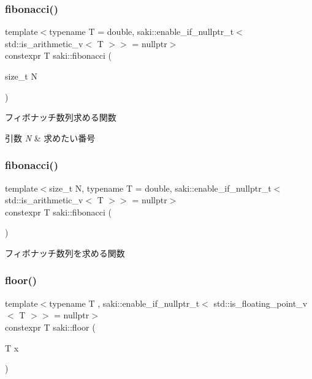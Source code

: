 \subsubsection{\texorpdfstring{fibonacci()}{fibonacci()}\hspace{0.1cm}{\footnotesize\ttfamily [1/2]}}
{\footnotesize\ttfamily template$<$typename T  = double, saki\+::enable\+\_\+if\+\_\+nullptr\+\_\+t$<$ std\+::is\+\_\+arithmetic\+\_\+v$<$ T $>$$>$  = nullptr$>$ \\
constexpr T saki\+::fibonacci (\begin{DoxyParamCaption}\item[{size\+\_\+t}]{N }\end{DoxyParamCaption})}



フィボナッチ数列求める関数 


\begin{DoxyParams}{引数}
{\em N} & 求めたい番号 \\
\hline
\end{DoxyParams}
\mbox{\label{namespacesaki_ac830e7b8acb5cda194f6ba9f340e5bc0}} 
\subsubsection{\texorpdfstring{fibonacci()}{fibonacci()}\hspace{0.1cm}{\footnotesize\ttfamily [2/2]}}
{\footnotesize\ttfamily template$<$size\+\_\+t N, typename T  = double, saki\+::enable\+\_\+if\+\_\+nullptr\+\_\+t$<$ std\+::is\+\_\+arithmetic\+\_\+v$<$ T $>$$>$  = nullptr$>$ \\
constexpr T saki\+::fibonacci (\begin{DoxyParamCaption}{ }\end{DoxyParamCaption})}



フィボナッチ数列を求める関数 

\mbox{\label{namespacesaki_a0718c031975604811084b62bbba93f7f}} 
\subsubsection{\texorpdfstring{floor()}{floor()}\hspace{0.1cm}{\footnotesize\ttfamily [1/2]}}
{\footnotesize\ttfamily template$<$typename T , saki\+::enable\+\_\+if\+\_\+nullptr\+\_\+t$<$ std\+::is\+\_\+floating\+\_\+point\+\_\+v$<$ T $>$$>$  = nullptr$>$ \\
constexpr T saki\+::floor (\begin{DoxyParamCaption}\item[{T}]{x }\end{DoxyParamCaption})}



